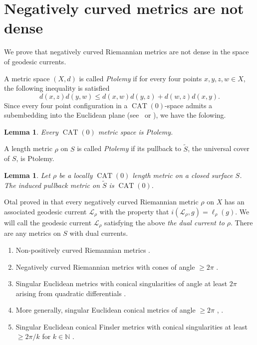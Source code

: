 \documentclass[12pt]{amsart}
\numberwithin{equation}{section}
\numberwithin{figure}{section}
\newtheorem{lemma}[equation]{Lemma}
\theoremstyle{definition}
\theoremstyle{plain}
\DeclareMathOperator{\CAT}{CAT}
\newcommand*{\wt}[1]{\widetilde{#1}}
\begin{document}
\section{Negatively curved metrics are not dense}
\label{sec:neg_notdense}
We prove that negatively curved Riemannian metrics are not dense in the space of geodesic currents.

A metric space $(X,d)$ is called \emph{Ptolemy} if for every four points $x,y,z,w \in X$, the following inequality is satisfied
\[
d(x,z)d(y,w) \leq d(x,w)d(y,z) + d(w,z)d(x,y).
\]
Since every four point configuration in a
 $\CAT(0)$-space admits a subembedding into the Euclidean plane (see~\cite[Page 164]{BH11:NonPosCurvature} or \cite[Section~2]{FLS07:Ptolemy}), we have the folowing.
 
\begin{lemma}
Every $\CAT(0)$ metric space is Ptolemy.
\label{lem:cat0_ptolemy}
\end{lemma} 

A length metric $\rho$ on $S$ is called \emph{Ptolemy} if its pullback to $\wt{S}$, the universal cover of $S$, is Ptolemy. 

\begin{lemma}
Let $\rho$ be a locally $\CAT(0)$ length metric on a closed surface $S$. The induced pullback metric on $\wt{S}$ is $\CAT(0)$.
\end{lemma}

Otal proved in \cite{Otal90:SpectreMarqueNegative} that every negatively curved Riemannian metric $\rho$ on $X$ has an associated geodesic current $\mathcal{L}_{\rho}$ with the property that $i(\mathcal{L}_{\rho},g)=\ell_{\rho}(g)$. We will call the geodesic current $\mathcal{L}_{\rho}$ satisfying the above \emph{the dual current to $\rho$}. There are any metrics on $S$ with dual currents.

\begin{enumerate}
\item Non-positively curved Riemannian metrics
\cite[Theorem~A]{CFF92:RigidityNonPosCurvedRiem}.
\item Negatively curved Riemannian metrics with cones of angle $\geq 2\pi$ \cite[Theorem~A]{HP97:RigidityNegCurvedCone}.
\item Singular Euclidean metrics with conical singularities of angle at least $2\pi$ arising from quadratic differentials \cite[Lemma~9]{DLR10:DegenerationFlatMetrics}.
\item More generally, singular Euclidean conical metrics of angle $\geq 2\pi$ \cite[Proposition~3.3]{BL17:RigidityFlat}, \cite{Con18:MarkedNonpos}.
\item Singular Euclidean conical Finsler metrics with conical singularities at least $\geq 2\pi/k$ for $k \in \mathbb{N}$ \cite[Theorem~1.2]{PozzettiShi26:FinslerTranslation}.
\end{enumerate}
\end{document}
